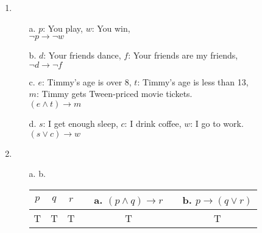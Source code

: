 
\newcommand{\laClass}       {CS 210}
\newcommand{\laSemester}    {Spring 2018}
\newcommand{\laChapter}     {1.5}
\newcommand{\laType}        {Exercise}
\newcommand{\laPoints}      {5}
\newcommand{\laTitle}       {Implications}
\newcommand{\laDate}        {}
\setcounter{chapter}{5}
\setcounter{section}{1}
\addtocounter{section}{-1}

\toggletrue{answerkey}




\begin{enumerate}

    \item
        \begin{itemize}
            \item[a.]  $p$: You play, $w$: You win, \\
                        $\neg p \to \neg w$
                        
            \item[b.]  $d$: Your friends dance, $f$: Your friends are my friends,\\
                        $\neg d \to \neg f$
                        
            \item[c.]  $e$: Timmy's age is over 8, $t$: Timmy's age is less than 13, \\
                        $m$: Timmy gets Tween-priced movie tickets. \\
                        $(e \land t) \to m$
                        
            \item[d.]  $s$: I get enough sleep, $c$: I drink coffee, $w$: I go to work. \\
                        $(s \lor c) \to w$
        \end{itemize}

    
    \item
        \begin{itemize}
            \item[a. b.]  
                \begin{tabular}{ c c c | p{2cm} c | p{2cm} c | }
                    $p$ & $q$ & $r$ & & a. $(p \land q) \to r$ & & b. $p \to (q \lor r)$
                    \\ \hline
                    T & T & T &
                    &  T  &
                    &  T 


\end{tabular}
\end{itemize}
\end{enumerate}
